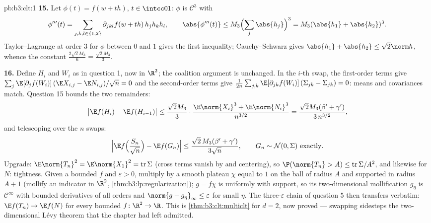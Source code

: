 \begin{solution}{pb:b3:clt:1}
\textbf{15.} Let $\phi(t) = f(w + th)$, $t \in \intcc01$:
$\phi$ is $\mathcal C^3$ with
\[
\phi'''(t) = \sum_{j,k,l\in\{1,2\}}\partial_{jkl}f(w +
th)\,h_jh_kh_l, \qquad \abs{\phi'''(t)} \leq
M_3\Bigl(\sum_j\abs{h_j}\Bigr)^3 = M_3(\abs{h_1} +
\abs{h_2})^3 .
\]
Taylor--Lagrange at order $3$ for $\phi$ between $0$ and
$1$ gives the first inequality; Cauchy--Schwarz gives
$\abs{h_1} + \abs{h_2} \leq \sqrt2\norm h$, whence the
constant $\frac{2\sqrt2M_3}6 = \frac{\sqrt2M_3}3$.

\textbf{16.} Define $H_i$ and $W_i$ as in question 1, now
in $\R^2$; the coalition argument is unchanged. In the
$i$-th swap, the first-order terms give
$\sum_j\E[\partial_jf(W_i)]\,(\E X_{i,j} - \E N_{i,j})/
\sqrt n = 0$ and the second-order terms give
$\frac1{2n}\sum_{j,k}\E[\partial_{jk}f(W_i)]\,(\Sigma_{jk}
- \Sigma_{jk}) = 0$: means and covariances match. Question
15 bounds the two remainders:
\[
\bigl|\E f(H_i) - \E f(H_{i-1})\bigr| \leq
\frac{\sqrt2M_3}3\cdot\frac{\E\norm{X_i}^3 +
\E\norm{N_i}^3}{n^{3/2}}
= \frac{\sqrt2M_3(\beta' + \gamma')}{3\,n^{3/2}},
\]
and telescoping over the $n$ swaps:
\[
\Bigl|\E f\Bigl(\frac{S_n}{\sqrt n}\Bigr) - \E
f(G_n)\Bigr| \leq \frac{\sqrt2\,M_3(\beta' +
\gamma')}{3\sqrt n},
\qquad G_n \sim \mathcal N(0, \Sigma)\ \text{exactly} .
\]
Upgrade: $\E\norm{T_n}^2 = \E\norm{X_1}^2 =
\operatorname{tr}\Sigma$ (cross terms vanish by
 and centering), so $\P(\norm{T_n} > A) \leq
\operatorname{tr}\Sigma/A^2$, and likewise for $N$:
tightness. Given a bounded  $f$ and $\varepsilon
> 0$, multiply by a smooth plateau $\chi$ equal to $1$ on
the ball of radius $A$ and supported in radius $A + 1$
(mollify an indicator in $\R^2$,
\cref{thm:b3:lp:regularization}); $g = f\chi$ is uniformly
 with  support, so its two-dimensional
mollification $g_\eta$ is $\mathcal C^\infty$ with bounded
derivatives of all orders and $\norm{g - g_\eta}_\infty
\leq \varepsilon$ for small $\eta$. The three-$\varepsilon$
chain of question 5 then transfers verbatim: $\E f(T_n)
\to \E f(N)$ for every bounded  $f \colon \R^2
\to \R$. This is \cref{thm:b3:clt:multiclt} for $d = 2$,
now proved --- swapping sidesteps the two-dimensional
L\'evy theorem that the chapter had left admitted.


\end{solution}
